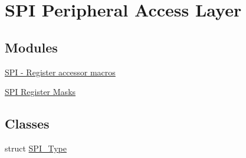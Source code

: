 \hypertarget{group__SPI__Peripheral__Access__Layer}{}\section{S\+PI Peripheral Access Layer}
\label{group__SPI__Peripheral__Access__Layer}
\subsection*{Modules}
\begin{DoxyCompactItemize}
\item 
\hyperlink{group__SPI__Register__Accessor__Macros}{S\+P\+I -\/ Register accessor macros}
\item 
\hyperlink{group__SPI__Register__Masks}{S\+P\+I Register Masks}
\end{DoxyCompactItemize}
\subsection*{Classes}
\begin{DoxyCompactItemize}
\item 
struct \hyperlink{structSPI__Type}{S\+P\+I\+\_\+\+Type}
\end{DoxyCompactItemize}
